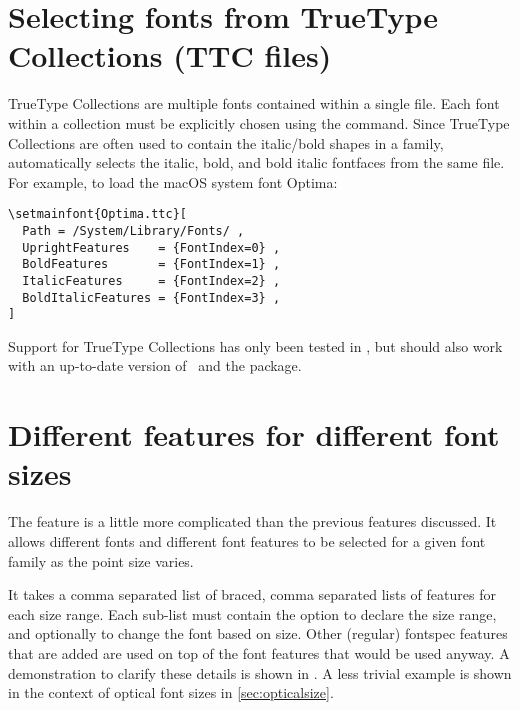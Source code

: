 \section{Selecting fonts from TrueType Collections (TTC files)}
TrueType Collections are multiple fonts contained within a single file.
Each font within a collection must be explicitly chosen using the  command.
Since TrueType Collections are often used to contain the italic/bold shapes in a family,  automatically selects the italic, bold, and bold italic fontfaces from the same file.
For example, to load the macOS system font Optima:
\begin{Verbatim}
\setmainfont{Optima.ttc}[
  Path = /System/Library/Fonts/ ,
  UprightFeatures    = {FontIndex=0} ,
  BoldFeatures       = {FontIndex=1} ,
  ItalicFeatures     = {FontIndex=2} ,
  BoldItalicFeatures = {FontIndex=3} ,
]
\end{Verbatim}
Support for TrueType Collections has only been tested in \XeTeX, but should also work with an up-to-date version of \LuaTeX\ and the  package.


\section{Different features for different font sizes}
\label{sec:sizefeature}


The  feature is a little more complicated
than the previous features discussed. It allows different fonts
and different font features to be selected for a given font
family as the point size varies.

It takes a comma separated list of braced, comma separated lists of features for each size range.
Each sub-list must contain the  option
to declare the size range, and optionally  to change the
font based on size. Other (regular) fontspec features that are added
are used on top of the font features that would be used anyway.
A demonstration to clarify these details is shown in .
A less trivial example is shown in the context of optical font sizes
in \vref{sec:opticalsize}.

